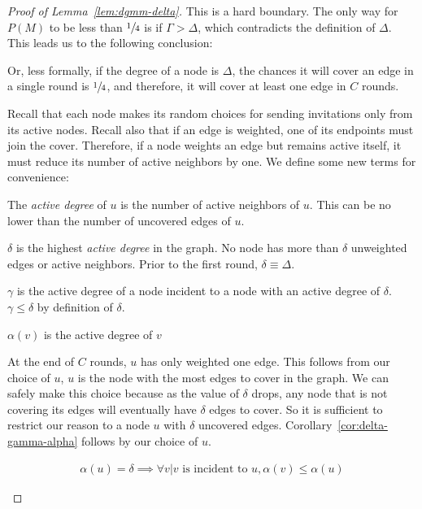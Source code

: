 \begin{proof}[Proof of Lemma~\ref{lem:dgmm-delta}]
  This is a hard boundary. The only way for $P(M)$ to be less than $\sfrac{1}{4}$ is if $\Gamma > \Delta$, which contradicts the definition of $\Delta$. This leads us to the following conclusion:

  

  Or, less formally, if the degree of a node is $\Delta$, the chances it will cover an edge in a single round is $\sfrac{1}{4}$, and therefore, it will cover at least one edge in $C$ rounds.

  Recall that each node makes its random choices for sending invitations only from its active nodes. Recall also that if an edge is weighted, one of its endpoints must join the cover. Therefore, if a node weights an edge but remains active itself, it must reduce its number of active neighbors by one. We define some new terms for convenience:
  \begin{ldef}
  The {\em active degree} of $u$ is the number of active neighbors of $u$. This can be no lower than the number of uncovered edges of $u$.
  \end{ldef}
  \begin{ldef}
  $\delta$ is the highest {\em active degree} in the graph. No node has more than $\delta$ unweighted edges or active neighbors. Prior to the first round, $\delta \equiv \Delta$.
  \end{ldef}
  \begin{ldef}
  $\gamma$ is the active degree of a node incident to a node with an active degree of $\delta$. $\gamma \le \delta$ by definition of $\delta$.
  \end{ldef}
  \begin{ldef}
  $\alpha(v)$ is the active degree of $v$
  \end{ldef} 

  At the end of $C$ rounds, $u$ has only weighted one edge. This follows from our choice of $u$, $u$ is the node with the most edges to cover in the graph. We can safely make this choice because as the value of $\delta$ drops, any node that is not covering its edges will eventually have $\delta$ edges to cover. So it is sufficient to restrict our reason to a node $u$ with $\delta$ uncovered edges. Corollary~\ref{cor:delta-gamma-alpha} follows by our choice of $u$.

  \begin{cor}
  \label{cor:delta-gamma-alpha}
  \begin{align*}
\alpha(u) = \delta \implies \forall v | v \text{ is incident to } u, \alpha(v) \le \alpha(u)
    \end{align*}
    \end{cor}


\end{proof}
